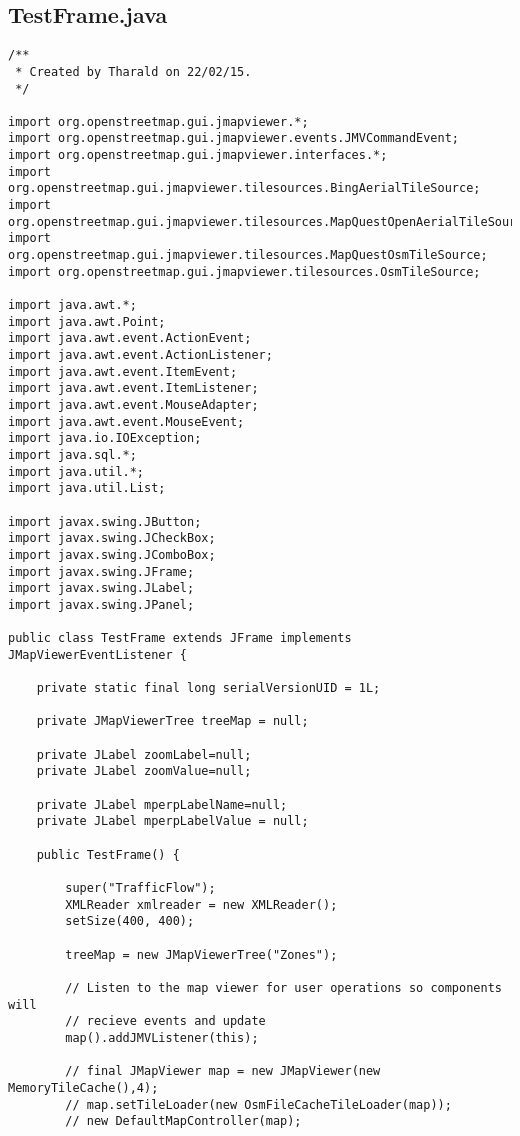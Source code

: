 \subsection{TestFrame.java}
\begin{verbatim}
/**
 * Created by Tharald on 22/02/15.
 */

import org.openstreetmap.gui.jmapviewer.*;
import org.openstreetmap.gui.jmapviewer.events.JMVCommandEvent;
import org.openstreetmap.gui.jmapviewer.interfaces.*;
import org.openstreetmap.gui.jmapviewer.tilesources.BingAerialTileSource;
import org.openstreetmap.gui.jmapviewer.tilesources.MapQuestOpenAerialTileSource;
import org.openstreetmap.gui.jmapviewer.tilesources.MapQuestOsmTileSource;
import org.openstreetmap.gui.jmapviewer.tilesources.OsmTileSource;

import java.awt.*;
import java.awt.Point;
import java.awt.event.ActionEvent;
import java.awt.event.ActionListener;
import java.awt.event.ItemEvent;
import java.awt.event.ItemListener;
import java.awt.event.MouseAdapter;
import java.awt.event.MouseEvent;
import java.io.IOException;
import java.sql.*;
import java.util.*;
import java.util.List;

import javax.swing.JButton;
import javax.swing.JCheckBox;
import javax.swing.JComboBox;
import javax.swing.JFrame;
import javax.swing.JLabel;
import javax.swing.JPanel;

public class TestFrame extends JFrame implements JMapViewerEventListener {

    private static final long serialVersionUID = 1L;

    private JMapViewerTree treeMap = null;

    private JLabel zoomLabel=null;
    private JLabel zoomValue=null;

    private JLabel mperpLabelName=null;
    private JLabel mperpLabelValue = null;

    public TestFrame() {

        super("TrafficFlow");
        XMLReader xmlreader = new XMLReader();
        setSize(400, 400);

        treeMap = new JMapViewerTree("Zones");

        // Listen to the map viewer for user operations so components will
        // recieve events and update
        map().addJMVListener(this);

        // final JMapViewer map = new JMapViewer(new MemoryTileCache(),4);
        // map.setTileLoader(new OsmFileCacheTileLoader(map));
        // new DefaultMapController(map);


\end{verbatim}

